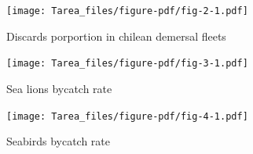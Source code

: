 \documentclass[
  super,
  preprint,
  3p]{elsarticle}
\begin{document}
\hypertarget{section}{%
\section*{}\label{section}}

\begin{figure}

{\centering \texttt{[image: Tarea\_files/figure-pdf/fig-2-1.pdf]}

}

\caption{\label{fig-2}Discards porportion in chilean demersal fleets}

\end{figure}

\begin{figure}

{\centering \texttt{[image: Tarea\_files/figure-pdf/fig-3-1.pdf]}

}

\caption{\label{fig-3}Sea lions bycatch rate}

\end{figure}

\begin{figure}

{\centering \texttt{[image: Tarea\_files/figure-pdf/fig-4-1.pdf]}

}

\caption{\label{fig-4}Seabirds bycatch rate}

\end{figure}


  
\end{document}
